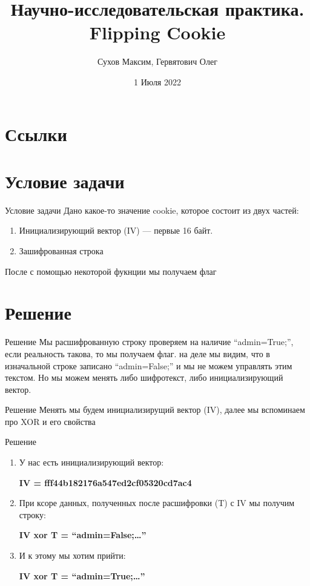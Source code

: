 \documentclass[12pt]{beamer}
\title{Научно-исследовательская практика. Flipping Cookie}
\author{Сухов Максим, Гервятович Олег}
\date{1 Июля 2022}
\begin{document}
\begin{titlepage}
       
\end{titlepage}
\section{Ссылки}
\section{Условие задачи}
\begin{frame}{Условие задачи}
    Дано какое-то значение cookie, которое состоит из двух частей:
    \begin{enumerate}
        \item Инициализирующий вектор (IV) — первые 16 байт.
        \item Зашифрованная строка 
    \end{enumerate}  
    После с помощью некоторой фукнции мы получаем флаг  
\end{frame}

\section{Решение}
\begin{frame}{Решение}
    Мы расшифрованную строку проверяем на наличие “admin=True;”, если реальность такова, то мы получаем флаг.
     на деле мы видим, что в изначальной строке записано “admin=False;” и мы не можем управлять этим текстом. Но мы можем менять либо шифротекст, либо инициализирующий вектор.
\end{frame}

\begin{frame}{Решение}
    Менять мы будем инициализирущий вектор (IV), далее мы вспоминаем про XOR и его свойства
\end{frame}

\begin{frame}{Решение}
  \begin{enumerate}
        \item У нас есть инициализирующий вектор:
        \par\textbf{IV = fff44b182176a547ed2cf05320cd7ac4}
        \item При ксоре данных, полученных после расшифровки (T) с IV мы получим строку:
        \par\textbf{IV xor T = “admin=False;…”}
        \item И к этому мы хотим прийти:
        \par\textbf{IV xor T = “admin=True;…”}
    \end{enumerate}  
\end{frame}
\end{document}
